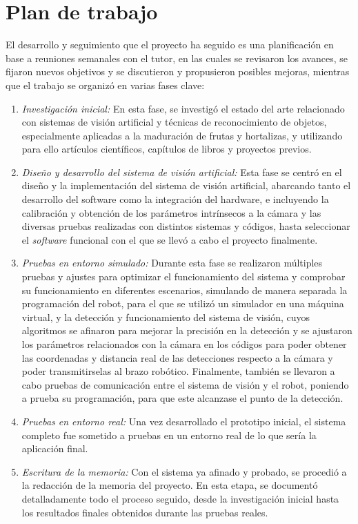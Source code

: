 \section{Plan de trabajo}
\label{sec:plantrabajo}
El desarrollo y seguimiento que el proyecto ha seguido es una planificación en base a reuniones semanales con el tutor, en las cuales se revisaron los avances, se fijaron nuevos objetivos y se discutieron y propusieron posibles mejoras, mientras que el trabajo se organizó en varias fases clave: 
\begin{enumerate}
  \item \textit{Investigación inicial:} En esta fase, se investigó el estado del arte relacionado con sistemas de visión artificial y técnicas de reconocimiento de objetos, especialmente aplicadas a la maduración de frutas y hortalizas, y utilizando para ello artículos científicos, capítulos de libros y proyectos previos. 
  \item \textit{Diseño y desarrollo del sistema de visión artificial:} Esta fase se centró en el diseño y la implementación del sistema de visión artificial, abarcando tanto el desarrollo del software como la integración del hardware, e incluyendo la calibración y obtención de los parámetros intrínsecos a la cámara y las diversas pruebas realizadas con distintos sistemas y códigos, hasta seleccionar el \textit{software} funcional con el que se llevó a cabo el proyecto finalmente.
  \item \textit{Pruebas en entorno simulado:} Durante esta fase se realizaron múltiples pruebas y ajustes para optimizar el funcionamiento del sistema y comprobar su funcionamiento en diferentes escenarios, simulando de manera separada la programación del robot, para el que se utilizó un simulador en una máquina virtual, y la detección y funcionamiento del sistema de visión, cuyos algoritmos se afinaron para mejorar la precisión en la detección y se ajustaron los parámetros relacionados con la cámara en los códigos para poder obtener las coordenadas y distancia real de las detecciones respecto a la cámara y poder transmitirselas al brazo robótico. Finalmente, también se llevaron a cabo pruebas de comunicación entre el sistema de visión y el robot, poniendo a prueba su programación, para que este alcanzase el punto de la detección.
  \item \textit{Pruebas en entorno real:} Una vez desarrollado el prototipo inicial, el sistema completo fue sometido a pruebas en un entorno real de lo que sería la aplicación final. 
  \item \textit{Escritura de la memoria:} Con el sistema ya afinado y probado, se procedió a la redacción de la memoria del proyecto. En esta etapa, se documentó detalladamente todo el proceso seguido, desde la investigación inicial hasta los resultados finales obtenidos durante las pruebas reales. 
\end{enumerate}
